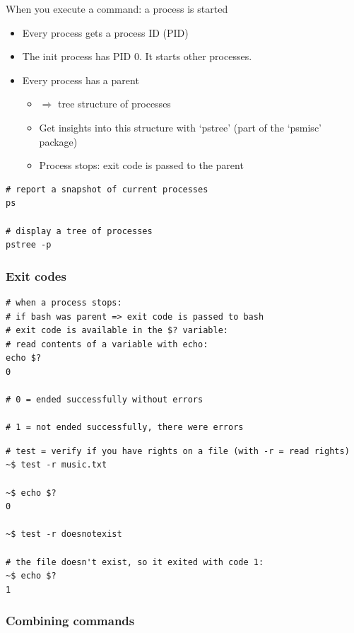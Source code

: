 \documentclass{article}
\begin{document}
When you execute a command: a process is started

\begin{itemize}
    \item Every process gets a process ID (PID)
    \item The init process has PID 0. It starts other processes.
    \item Every process has a parent
    \begin{itemize}
        \item $\Rightarrow$ tree structure of processes
        \item Get insights into this structure with `pstree' (part of the `psmisc' package)
        \item Process stops: exit code is passed to the parent
    \end{itemize}
\end{itemize}

\begin{verbatim}
# report a snapshot of current processes
ps

# display a tree of processes
pstree -p
\end{verbatim}


\subsubsection{Exit codes}

\begin{verbatim}
# when a process stops:
# if bash was parent => exit code is passed to bash
# exit code is available in the $? variable:
# read contents of a variable with echo:
echo $?
0

# 0 = ended successfully without errors

# 1 = not ended successfully, there were errors
\end{verbatim}

\begin{verbatim}
# test = verify if you have rights on a file (with -r = read rights)
~$ test -r music.txt

~$ echo $?
0

~$ test -r doesnotexist

# the file doesn't exist, so it exited with code 1:
~$ echo $?
1
\end{verbatim}

\subsubsection{Combining commands}
\end{document}
